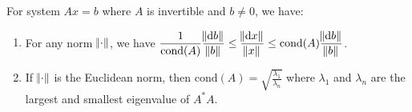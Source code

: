 \begin{theorem}
    For system $Ax=b$ where $A$ is invertible and $b \neq 0$, we have:
    \begin{enumerate}
        \item For any norm $\norm{\cdot}$, we have $\displaystyle \frac{1}{\text{cond}(A)} \frac{\norm{\dif b}}{\norm{b}} \leq \frac{\norm{\dif x}}{\norm{x}} \leq \text{cond}(A) \frac{\norm{\dif b}}{\norm{b}}$.
        \item If $\norm{\cdot}$ is the Euclidean norm, then $\displaystyle \text{cond}(A) = \sqrt{\frac{\lambda_1}{\lambda_n}}$ where $\lambda_1$ and $\lambda_n$ are the largest and smallest eigenvalue of $A^*A$.
    \end{enumerate}
\end{theorem}




















































































